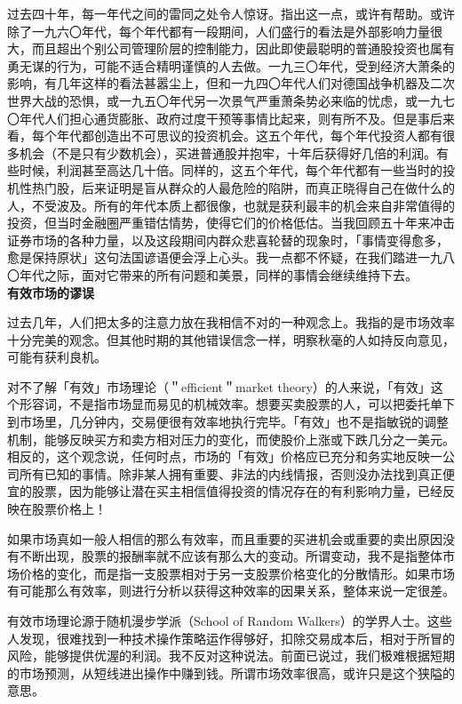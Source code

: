 \documentclass[UTF8,a4paper,zihao=-4,fontset = windows]{ctexart} %
\begin{document}
过去四十年，每一年代之间的雷同之处令人惊讶。指出这一点，或许有帮助。或许除了一九六〇年代，每个年代都有一段期间，人们盛行的看法是外部影响力量很大，而且超出个别公司管理阶层的控制能力，因此即使最聪明的普通股投资也属有勇无谋的行为，可能不适合精明谨慎的人去做。一九三〇年代，受到经济大萧条的影响，有几年这样的看法甚嚣尘上，但和一九四〇年代人们对德国战争机器及二次世界大战的恐惧，或一九五〇年代另一次景气严重萧条势必来临的忧虑，或一九七〇年代人们担心通货膨胀、政府过度干预等事情比起来，则有所不及。但是事后来看，每个年代都创造出不可思议的投资机会。这五个年代，每个年代投资人都有很多机会（不是只有少数机会），买进普通股并抱牢，十年后获得好几倍的利润。有些时候，利润甚至高达几十倍。同样的，这五个年代，每个年代都有一些当时的投机性热门股，后来证明是盲从群众的人最危险的陷阱，而真正晓得自己在做什么的人，不受波及。所有的年代本质上都很像，也就是获利最丰的机会来自非常值得的投资，但当时金融圈严重错估情势，使得它们的价格低估。当我回顾五十年来冲击证券市场的各种力量，以及这段期间内群众悲喜轮替的现象时，「事情变得愈多，愈是保持原状」这句法国谚语便会浮上心头。我一点都不怀疑，在我们踏进一九八〇年代之际，面对它带来的所有问题和美景，同样的事情会继续维持下去。
\\

\textbf{有效市场的谬误}


过去几年，人们把太多的注意力放在我相信不对的一种观念上。我指的是市场效率十分完美的观念。但其他时期的其他错误信念一样，明察秋毫的人如持反向意见，可能有获利良机。

对不了解「有效」市场理论（＂efficient＂market theory）的人来说，「有效」这个形容词，不是指市场显而易见的机械效率。想要买卖股票的人，可以把委托单下到市场里，几分钟内，交易便很有效率地执行完毕。「有效」也不是指敏锐的调整机制，能够反映买方和卖方相对压力的变化，而使股价上涨或下跌几分之一美元。相反的，这个观念说，任何时点，市场的「有效」价格应已充分和务实地反映一公司所有已知的事情。除非某人拥有重要、非法的内线情报，否则没办法找到真正便宜的股票，因为能够让潜在买主相信值得投资的情况存在的有利影响力量，已经反映在股票价格上！

如果市场真如一般人相信的那么有效率，而且重要的买进机会或重要的卖出原因没有不断出现，股票的报酬率就不应该有那么大的变动。所谓变动，我不是指整体市场价格的变化，而是指一支股票相对于另一支股票价格变化的分散情形。如果市场有可能那么有效率，则进行分析以获得这种效率的因果关系，整体来说一定很差。

有效市场理论源于随机漫步学派（School of Random Walkers）的学界人士。这些人发现，很难找到一种技术操作策略运作得够好，扣除交易成本后，相对于所冒的风险，能够提供优渥的利润。我不反对这种说法。前面已说过，我们极难根据短期的市场预测，从短线进出操作中赚到钱。所谓市场效率很高，或许只是这个狭隘的意思。
\end{document}
